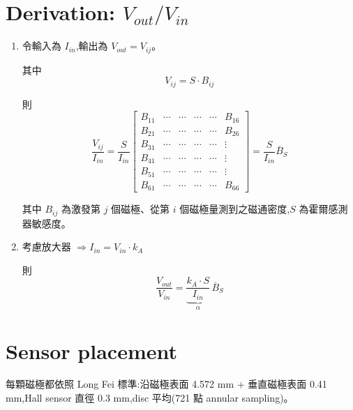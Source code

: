 \documentclass[12pt,a4paper]{article}
\begin{document}
\section{Derivation: $V_{out}/V_{in}$}

\begin{enumerate}
    \item 令輸入為 $I_{in}$,輸出為 $V_{out} = V_{ij}$。

    其中
    \begin{equation}
        V_{ij} = S \cdot B_{ij}
    \end{equation}

    則
    \begin{equation}
        \frac{V_{ij}}{I_{in}} = \frac{S}{I_{in}}
        \begin{bmatrix}
            B_{11} & \cdots & \cdots & \cdots & \cdots & B_{16} \\
            B_{21} & \cdots & \cdots & \cdots & \cdots & B_{26} \\
            B_{31} & \cdots & \cdots & \cdots & \cdots & \vdots \\
            B_{41} & \cdots & \cdots & \cdots & \cdots & \vdots \\
            B_{51} & \cdots & \cdots & \cdots & \cdots & \vdots \\
            B_{61} & \cdots & \cdots & \cdots & \cdots & B_{66}
        \end{bmatrix}
        = \frac{S}{I_{in}} \overline{B}_S
    \end{equation}

    其中 $B_{ij}$ 為激發第 $j$ 個磁極、從第 $i$ 個磁極量測到之磁通密度,$S$ 為霍爾感測器敏感度。

    \item 考慮放大器 $\Rightarrow I_{in} = V_{in} \cdot k_A$

    則
    \begin{equation}
        \frac{V_{out}}{V_{in}} = \underbrace{\frac{k_A \cdot S}{I_{in}}}_{\alpha}\,\overline{B}_S
    \end{equation}
\end{enumerate}

\section{Sensor placement}

每顆磁極都依照 Long Fei 標準:沿磁極表面 4.572 mm + 垂直磁極表面 0.41 mm,Hall sensor 直徑 0.3 mm,disc 平均(721 點 annular sampling)。
\end{document}
